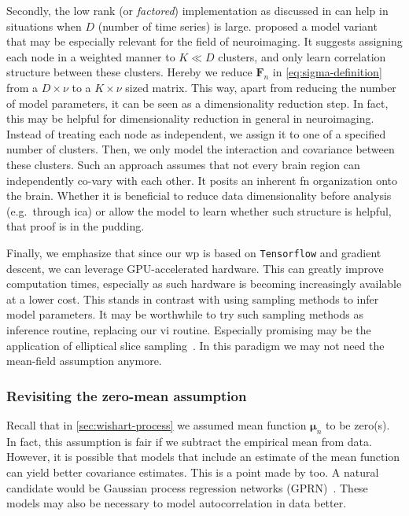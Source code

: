 Secondly, the low rank (or \emph{factored}) implementation as discussed in \textcite{Heaukulani2019} can help in situations when $D$ (number of time series) is large.
\textcite{Heaukulani2019} proposed a model variant~\parencite[in turn built upon work by][]{Fox2015} that may be especially relevant for the field of neuroimaging.
It suggests assigning each node in a weighted manner to $K \ll D$ clusters, and only learn correlation structure between these clusters.
Hereby we reduce $\mathbf{F}_n$ in \cref{eq:sigma-definition} from a $D \times \nu$ to a $K \times \nu$ sized matrix.
This way, apart from reducing the number of model parameters, it can be seen as a dimensionality reduction step.
%
In fact, this may be helpful for dimensionality reduction in general in neuroimaging.
Instead of treating each node as independent, we assign it to one of a specified number of clusters.
Then, we only model the interaction and covariance between these clusters.
Such an approach assumes that not every brain region can independently co-vary with each other.
It posits an inherent \gls{fn} organization onto the brain.
Whether it is beneficial to reduce data dimensionality before analysis (e.g.~through \gls{ica}) or allow the model to learn whether such structure is helpful, that proof is in the pudding.

Finally, we emphasize that since our \gls{wp} is based on \texttt{Tensorflow} and gradient descent, we can leverage GPU-accelerated hardware.
This can greatly improve computation times, especially as such hardware is becoming increasingly available at a lower cost.
This stands in contrast with using sampling methods to infer model parameters.
%
It may be worthwhile to try such sampling methods as inference routine, replacing our \gls{vi} routine.
Especially promising may be the application of elliptical slice sampling~\parencite{Murray2010}.
In this paradigm we may not need the mean-field assumption anymore.

\subsubsection{Revisiting the zero-mean assumption}

Recall that in \cref{sec:wishart-process} we assumed mean function $\mathbf{\mu}_n$ to be zero(s).
In fact, this assumption is fair if we subtract the empirical mean from data.
%
However, it is possible that models that include an estimate of the mean function can yield better covariance estimates.
This is a point made by \textcite{Lan2017} too.
A natural candidate would be Gaussian process regression networks (GPRN)~\parencite{Wilson2012}.
These models may also be necessary to model autocorrelation in data better.

